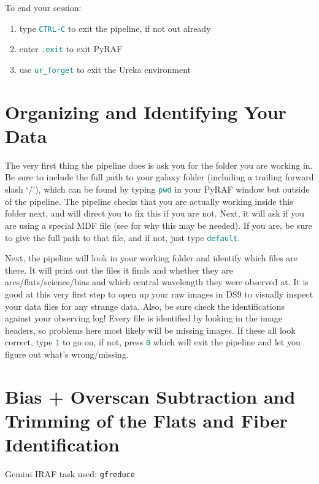 \documentclass[12pt]{report}
\newcommand{\ty}[1]{\textcolor{teal}{\texttt{#1}}}
\begin{document}
\noindent To end your session:
\begin{enumerate}
\item type \ty{CTRL-C} to exit the pipeline, if not out already
\item enter \ty{.exit} to exit PyRAF
\item use \ty{ur\_forget} to exit the Ureka environment
\end{enumerate}

\bigskip
\section{Organizing and Identifying Your Data}

\noindent The very first thing the pipeline does is ask you for the folder you are working in. Be sure to include the full path to your galaxy folder (including a trailing forward slash `/'), which can be found by typing \ty{pwd} in your PyRAF window but outside of the pipeline. The pipeline checks that you are actually working inside this folder next, and will direct you to fix this if you are not. Next, it will ask if you are using a special MDF file (see \label{badfiber} for why this may be needed). If you are, be sure to give the full path to that file, and if not, just type \ty{default}.

Next, the pipeline will look in your working folder and identify which files are there. It will print out the files it finds and whether they are arcs/flats/science/bias and which central wavelength they were observed at. It is good at this very first step to open up your raw images in DS9 to visually inspect your data files for any strange data. Also, be sure check the identifications against your observing log! Every file is identified by looking in the image headers, so problems here most likely will be missing images. If these all look correct, type \ty{1} to go on, if not, press \ty{0} which will exit the pipeline and let you figure out what's wrong/missing.

\bigskip
\section{Bias + Overscan Subtraction and Trimming of the Flats and Fiber Identification}
\label{fibers}

\noindent Gemini IRAF task used: \texttt{gfreduce} \\
\end{document}
